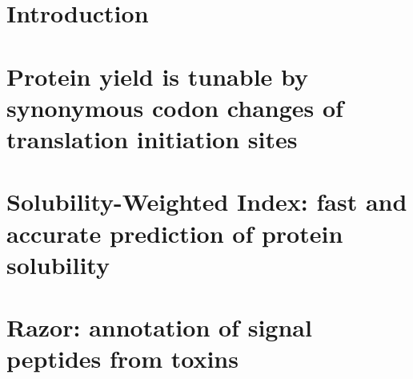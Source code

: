 \documentclass[]{lincolncsthesis}
\begin{document}

\maketitle











\thesisTables
\thesisBodyStart



\chapter{Introduction}


\chapter{Protein yield is tunable by synonymous codon changes of translation initiation sites}


\chapter{Solubility-Weighted Index: fast and accurate prediction of protein solubility}\label{chap:Solubility}


\chapter{Razor: annotation of signal peptides from toxins}

\end{document}

